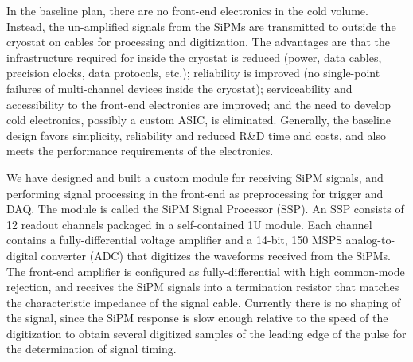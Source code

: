 In the baseline plan, there are no front-end electronics in the cold volume.  
Instead, the un-amplified signals from the SiPMs 
are transmitted to outside the cryostat on cables for processing and digitization.
The advantages are that the infrastructure required for inside the cryostat is 
reduced (power, data cables, precision clocks, data protocols, etc.); reliability is 
improved (no single-point failures of multi-channel 
devices inside the cryostat); serviceability and accessibility to the front-end 
electronics are improved; and the need to develop cold 
electronics, possibly a custom ASIC, is eliminated.  
Generally, the baseline 
design favors simplicity, reliability and reduced R\&D time and costs, and also 
meets the performance requirements of the electronics.  

We have designed and built a 
custom module for receiving SiPM signals, and performing signal 
processing in the front-end as preprocessing for trigger and DAQ.  
The module is called the SiPM Signal Processor (SSP).  
An SSP consists of 12 readout channels packaged in a self-contained 
1U module.  
Each channel contains a fully-differential voltage amplifier and a 
14-bit, 150 MSPS analog-to-digital converter (ADC) that 
digitizes the waveforms received from the SiPMs.  
The front-end amplifier is configured as fully-differential with high common-mode 
rejection, and receives the SiPM signals into a termination resistor that 
matches the characteristic impedance of the signal cable. 
Currently there is no shaping of the signal, since the SiPM response 
is slow enough relative to the speed of the digitization to obtain 
several digitized samples of the leading edge of the pulse for the determination of signal timing.  

